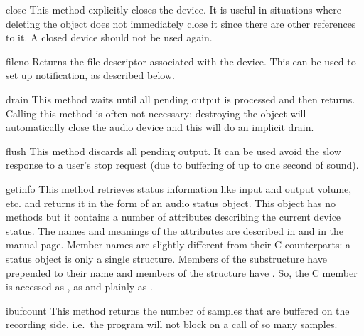 \begin{methoddesc}{close}{}
This method explicitly closes the device. It is useful in situations
where deleting the object does not immediately close it since there
are other references to it. A closed device should not be used again.
\end{methoddesc}

\begin{methoddesc}{fileno}{}
Returns the file descriptor associated with the device.  This can be
used to set up  notification, as described below.
\end{methoddesc}

\begin{methoddesc}{drain}{}
This method waits until all pending output is processed and then returns.
Calling this method is often not necessary: destroying the object will
automatically close the audio device and this will do an implicit drain.
\end{methoddesc}

\begin{methoddesc}{flush}{}
This method discards all pending output. It can be used avoid the
slow response to a user's stop request (due to buffering of up to one
second of sound).
\end{methoddesc}

\begin{methoddesc}{getinfo}{}
This method retrieves status information like input and output volume,
etc. and returns it in the form of
an audio status object. This object has no methods but it contains a
number of attributes describing the current device status. The names
and meanings of the attributes are described in
 and in the 
manual page.  Member names
are slightly different from their C counterparts: a status object is
only a single structure. Members of the  substructure have
 prepended to their name and members of the 
structure have . So, the C member  is
accessed as ,  as 
and  plainly as .
\end{methoddesc}

\begin{methoddesc}{ibufcount}{}
This method returns the number of samples that are buffered on the
recording side, i.e.\ the program will not block on a
 call of so many samples.
\end{methoddesc}


